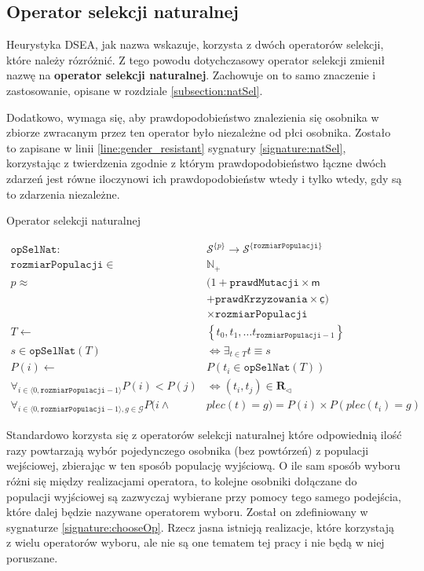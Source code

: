 \documentclass[twoside]{iisthesis}
\newcommand{\numberSet}[1]{\mathbb{#1}}
\newcommand{\important}[1]{\mathcal{#1}}
\newcommand{\R}{\mathbf{R}}
\newcommand{\minoritySpecimenRel}{{\R}_{\lhd}}
\newcommand{\param}[1]{\mathtt{#1}}
\newcommand{\variable}[1]{\mathsf{#1}}
\newcommand{\outputVar}[1]{\variable{\underline{#1}}}
\newcommand{\withSize}[2]{{#1}^{ \{ #2 \}}}
\newcommand{\range}[2]{\langle#1, #2\rangle}
\begin{document}
\subsection{Operator selekcji naturalnej} \label{subsection:new_natSel}

Heurystyka DSEA, jak nazwa wskazuje, korzysta z dwóch operatorów selekcji, które należy rózróżnić. 
Z tego powodu dotychczasowy operator selekcji zmienił nazwę na \textbf{operator selekcji naturalnej}. 
Zachowuje on to samo znaczenie i zastosowanie, opisane w rozdziale \ref{subsection:natSel}. 

Dodatkowo, wymaga się, aby prawdopodobieństwo znalezienia się osobnika w zbiorze zwracanym przez ten operator było niezależne od płci osobnika. 
Zostało to zapisane w linii \ref{line:gender_resistant} sygnatury \ref{signature:natSel}, korzystając z twierdzenia zgodnie z którym prawdopodobieństwo łączne dwóch zdarzeń jest równe iloczynowi ich prawdopodobieństw wtedy i tylko wtedy, gdy są to zdarzenia niezależne.

\begin{signature}
	\caption{Operator selekcji naturalnej \label{signature:natSel}}
	\begin{align}
	\param{opSelNat}: &\withSize{\important{S}}{p} \rightarrow \withSize{\important{S}}{\param{rozmiarPopulacji}} \\
	\param{rozmiarPopulacji} \in &\numberSet{N}_{+} \\
	p \approx &(1 + \param{prawdMutacji} \times \variable{m} \\
	&+ \param{prawdKrzyzowania} \times \outputVar{c}) \\
	&\times \param{rozmiarPopulacji} \\
	T \gets &\left\{ t_0, t_1, \ldots t_{\param{rozmiarPopulacji}-1} \right\} \\
	s \in \param{opSelNat}(T) &\Leftrightarrow \exists_{t \in T}  t \equiv s \\
	P(i) \gets &P(t_i \in \param{opSelNat}(T)) \\
	\forall_{i \in \range{0}{\param{rozmiarPopulacji}-1}}P(i) < P(j) &\Leftrightarrow (t_i, t_j) \in \minoritySpecimenRel \\
	\label{line:gender_resistant}
	\forall_{i \in \range{0}{\param{rozmiarPopulacji}-1}, g \in \important{G}}P(i \wedge & plec(t) = g) = P(i) \times P(plec(t_i) = g)
	\end{align}
\end{signature}

Standardowo korzysta się z operatorów selekcji naturalnej które odpowiednią ilość razy powtarzają wybór pojedynczego osobnika (bez powtórzeń) z populacji wejściowej, zbierając w ten sposób populację wyjściową. 
O ile sam sposób wyboru różni się między realizacjami operatora, to kolejne osobniki dołączane do populacji wyjściowej są zazwyczaj wybierane przy pomocy tego samego podejścia, które dalej będzie nazywane operatorem wyboru.
Został on zdefiniowany w sygnaturze \ref{signature:chooseOp}.
Rzecz jasna istnieją realizacje, które korzystają z wielu operatorów wyboru, ale nie są one tematem tej pracy i nie będą w niej poruszane.
\end{document}
